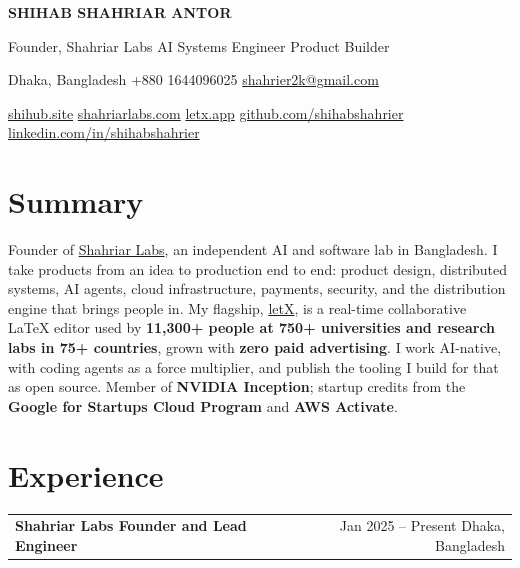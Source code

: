 \documentclass[10pt,a4paper]{article}
\makeatletter
\newcommand{\lxUsers}{11,300+}
\newcommand{\lxInstitutions}{750+}
\newcommand{\lxCountries}{75+}
\newcommand{\lnk}[2]{\href{#1}{\color{accent}#2}}
\newcommand{\role}[2]{%
  \begin{tabularx}{\linewidth}{@{}X r@{}}
    \sffamily\bfseries\normalsize #1 & \sffamily\small\color{muted} #2
  \end{tabularx}\par}
\newcommand{\sep}{\unskip\enspace{\color{muted}\textbar}\enspace\ignorespaces}
\makeatother
\begin{document}
\begin{center}
  {\sffamily\bfseries\fontsize{22}{24}\selectfont SHIHAB SHAHRIAR ANTOR}\par\vspace{4pt}
  {\sffamily\color{accent}Founder, Shahriar Labs \sep AI Systems Engineer \sep Product Builder}\par\vspace{4pt}
  {\small Dhaka, Bangladesh \sep +880 1644096025 \sep \lnk{mailto:shahrier2k@gmail.com}{shahrier2k@gmail.com}}\par\vspace{1pt}
  {\small \lnk{https://shihub.site}{shihub.site} \sep
    \lnk{https://shahriarlabs.com}{shahriarlabs.com} \sep
    \lnk{https://letx.app}{letx.app} \sep
    \lnk{https://github.com/shihabshahrier}{github.com/shihabshahrier} \sep
    \lnk{https://linkedin.com/in/shihabshahrier}{linkedin.com/in/shihabshahrier}}
\end{center}

\section{Summary}
Founder of \lnk{https://shahriarlabs.com}{Shahriar Labs}, an independent AI and software lab in Bangladesh.
I take products from an idea to production end to end: product design, distributed systems, AI agents,
cloud infrastructure, payments, security, and the distribution engine that brings people in.
My flagship, \lnk{https://letx.app}{letX}, is a real-time collaborative LaTeX editor used by
\textbf{\lxUsers{} people at \lxInstitutions{} universities and research labs in \lxCountries{} countries},
grown with \textbf{zero paid advertising}. I work AI-native, with coding agents as a force multiplier,
and publish the tooling I build for that as open source.
Member of \textbf{NVIDIA Inception}; startup credits from the \textbf{Google for Startups Cloud Program} and \textbf{AWS Activate}.

\section{Experience}
\role{Shahriar Labs \textnormal{\sep Founder and Lead Engineer}}{Jan 2025 -- Present \sep Dhaka, Bangladesh}
\vspace{-6pt}
\end{document}
